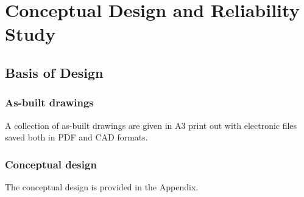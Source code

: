 \chapter{Conceptual Design and Reliability Study} %
\label{Chapter6}
%
\section{Basis of Design}
\subsection{As-built drawings}
A collection of as-built drawings are given in A3 print out with electronic files saved both in PDF and CAD formats.

\subsection{Conceptual design}
The conceptual design is provided in the Appendix.



